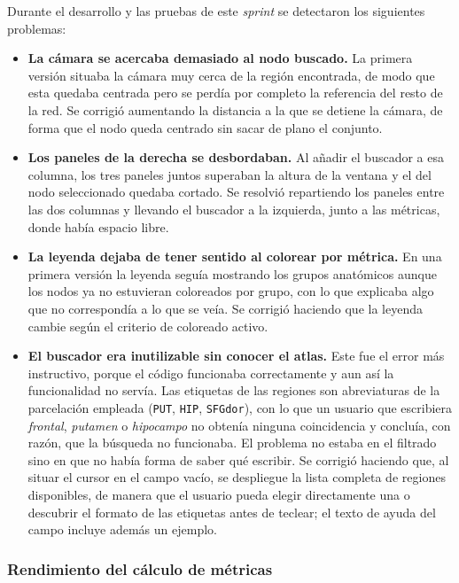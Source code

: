 Durante el desarrollo y las pruebas de este \textit{sprint} se detectaron los siguientes problemas:

\begin{itemize}
	\item \textbf{La cámara se acercaba demasiado al nodo buscado.} La primera versión situaba la
		cámara muy cerca de la región encontrada, de modo que esta quedaba centrada pero se perdía
		por completo la referencia del resto de la red. Se corrigió aumentando la distancia a la que
		se detiene la cámara, de forma que el nodo queda centrado sin sacar de plano el conjunto.
	\item \textbf{Los paneles de la derecha se desbordaban.} Al añadir el buscador a esa columna, los
		tres paneles juntos superaban la altura de la ventana y el del nodo seleccionado quedaba
		cortado. Se resolvió repartiendo los paneles entre las dos columnas y llevando el buscador a
		la izquierda, junto a las métricas, donde había espacio libre.
	\item \textbf{La leyenda dejaba de tener sentido al colorear por métrica.} En una primera versión
		la leyenda seguía mostrando los grupos anatómicos aunque los nodos ya no estuvieran coloreados
		por grupo, con lo que explicaba algo que no correspondía a lo que se veía. Se corrigió
		haciendo que la leyenda cambie según el criterio de coloreado activo.
	\item \textbf{El buscador era inutilizable sin conocer el atlas.} Este fue el error más
		instructivo, porque el código funcionaba correctamente y aun así la funcionalidad no servía.
		Las etiquetas de las regiones son abreviaturas de la parcelación empleada
		(\texttt{PUT}, \texttt{HIP}, \texttt{SFGdor}), con lo que un usuario que escribiera
		\textit{frontal}, \textit{putamen} o \textit{hipocampo} no obtenía ninguna coincidencia y
		concluía, con razón, que la búsqueda no funcionaba. El problema no estaba en el filtrado sino
		en que no había forma de saber qué escribir. Se corrigió haciendo que, al situar el cursor en
		el campo vacío, se despliegue la lista completa de regiones disponibles, de manera que el
		usuario pueda elegir directamente una o descubrir el formato de las etiquetas antes de
		teclear; el texto de ayuda del campo incluye además un ejemplo.
\end{itemize}

\subsubsection*{Rendimiento del cálculo de métricas}

